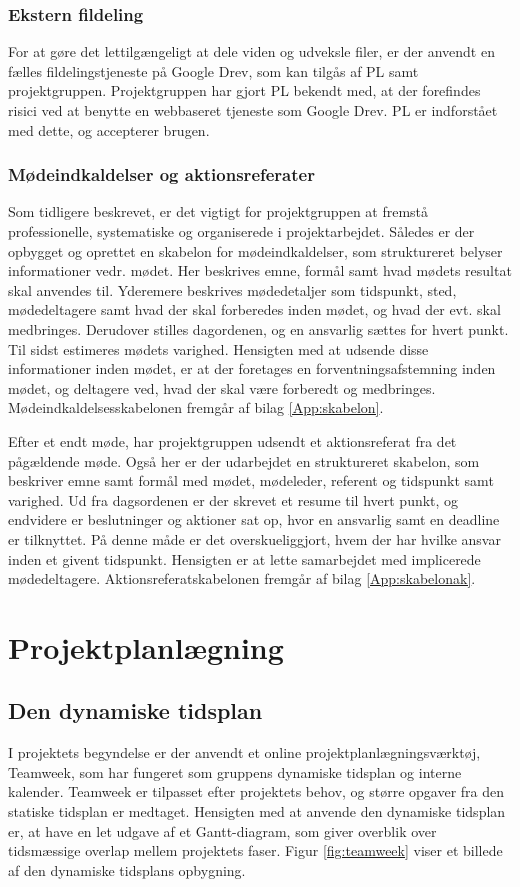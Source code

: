 	\subsubsection{Ekstern fildeling}
	For at gøre det lettilgængeligt at dele viden og udveksle filer, er der anvendt en fælles fildelingstjeneste på Google Drev, som kan tilgås af PL samt projektgruppen.  
	Projektgruppen har gjort PL bekendt med, at der forefindes risici ved at benytte en webbaseret tjeneste som Google Drev. PL er indforstået med dette, og accepterer brugen.
	 
	\subsubsection{Mødeindkaldelser og aktionsreferater}
	Som tidligere beskrevet, er det vigtigt for projektgruppen at fremstå professionelle, systematiske og organiserede i projektarbejdet. Således er der opbygget og oprettet en skabelon for mødeindkaldelser, som struktureret belyser informationer vedr. mødet. Her beskrives emne, formål samt hvad mødets resultat skal anvendes til. Yderemere beskrives mødedetaljer som tidspunkt, sted, mødedeltagere samt hvad der skal forberedes inden mødet, og hvad der evt. skal medbringes. Derudover stilles dagordenen, og en ansvarlig sættes for hvert punkt. Til sidst estimeres mødets varighed. Hensigten med at udsende disse informationer inden mødet, er at der foretages en forventningsafstemning inden mødet, og deltagere ved, hvad der skal være forberedt og medbringes. Mødeindkaldelsesskabelonen fremgår af bilag \ref{App:skabelon}.  
	
	Efter et endt møde, har projektgruppen udsendt et aktionsreferat fra det pågældende møde. Også her er der udarbejdet en struktureret skabelon, som beskriver emne samt formål med mødet, mødeleder, referent og tidspunkt samt varighed. Ud fra dagsordenen er der skrevet et resume til hvert punkt, og endvidere er beslutninger og aktioner sat op, hvor en ansvarlig samt en deadline er tilknyttet. På denne måde er det overskueliggjort, hvem der har hvilke ansvar inden et givent tidspunkt. Hensigten er at lette samarbejdet med implicerede mødedeltagere. Aktionsreferatskabelonen fremgår af bilag \ref{App:skabelonak}.        
	
\section{Projektplanlægning}  
\subsection{Den dynamiske tidsplan} 
I projektets begyndelse er der anvendt et online projektplanlægningsværktøj, Teamweek, som har fungeret som gruppens dynamiske tidsplan og interne kalender. Teamweek er tilpasset efter projektets behov, og større opgaver fra den statiske tidsplan er medtaget. Hensigten med at anvende den dynamiske tidsplan er, at have en let udgave af et Gantt-diagram, som giver overblik over tidsmæssige overlap mellem projektets faser. Figur \ref{fig:teamweek} viser et billede af den dynamiske tidsplans opbygning.  

